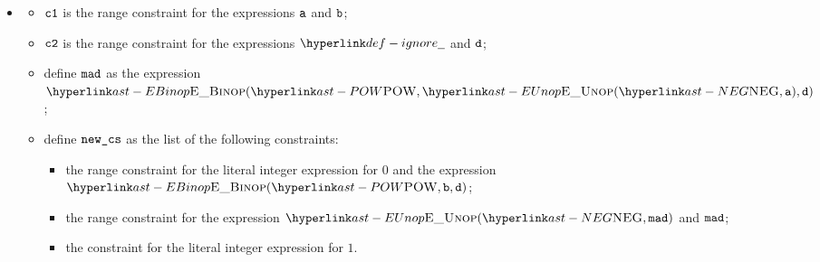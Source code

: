 \begin{itemize}
  \item {}
  \begin{itemize}
    \item $\vcone$ is the range constraint for the expressions $\va$ and $\vb$;
    \item $\vctwo$ is the range constraint for the expressions $\Ignore$ and $\vd$;
    \item define $\vmad$ as the expression $\EBinop(\POW, \EUnop(\NEG, \va), \vd)$;
    \item define $\newcs$ as the list of the following constraints:
    \begin{itemize}
      \item the range constraint for the literal integer expression for $0$ and the expression
            $\EBinop(\POW, \vb, \vd)$;
      \item the range constraint for the expression $\EUnop(\NEG, \vmad)$ and $\vmad$;
      \item the constraint for the literal integer expression for $1$.
    \end{itemize}
  \end{itemize}
\end{itemize}

\FormallyParagraph
\begin{mathpar}
\end{mathpar}

\begin{mathpar}
\end{mathpar}

\begin{mathpar}
\end{mathpar}

